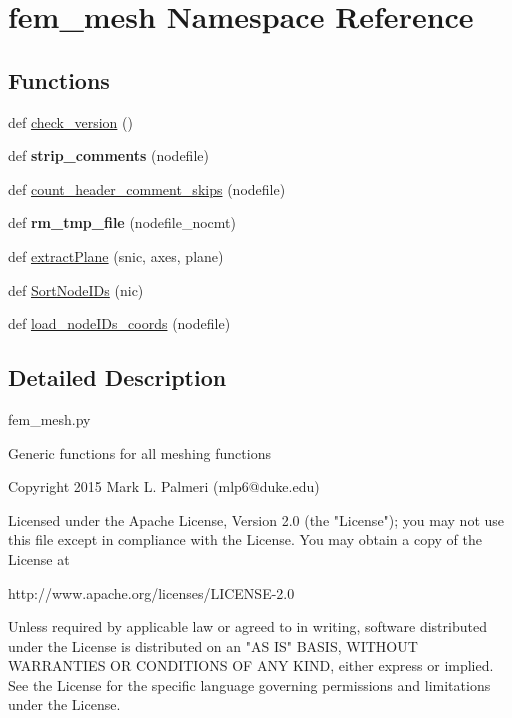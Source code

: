 \hypertarget{namespacefem__mesh}{}\section{fem\+\_\+mesh Namespace Reference}
\label{namespacefem__mesh}
\subsection*{Functions}
\begin{DoxyCompactItemize}
\item 
def \hyperlink{namespacefem__mesh_a54340024168d84ee90e2731de604b7c9}{check\+\_\+version} ()
\item 
\hypertarget{namespacefem__mesh_acb8e341fc4a11a41122239e92e80ef25}{}def {\bfseries strip\+\_\+comments} (nodefile)\label{namespacefem__mesh_acb8e341fc4a11a41122239e92e80ef25}

\item 
def \hyperlink{namespacefem__mesh_aecdc87300dbd7f57c9590be2eedfd4fd}{count\+\_\+header\+\_\+comment\+\_\+skips} (nodefile)
\item 
\hypertarget{namespacefem__mesh_a482eed29183411d7e6275f9936210eca}{}def {\bfseries rm\+\_\+tmp\+\_\+file} (nodefile\+\_\+nocmt)\label{namespacefem__mesh_a482eed29183411d7e6275f9936210eca}

\item 
def \hyperlink{namespacefem__mesh_a9426734369dcc9c64d9076c9e64eb761}{extract\+Plane} (snic, axes, plane)
\item 
def \hyperlink{namespacefem__mesh_a5c79e3243c130de5fe8c49b64ce408b1}{Sort\+Node\+I\+Ds} (nic)
\item 
def \hyperlink{namespacefem__mesh_ac22e65233eb8ce28d6b9d61969697859}{load\+\_\+node\+I\+Ds\+\_\+coords} (nodefile)
\end{DoxyCompactItemize}


\subsection{Detailed Description}
\begin{DoxyVerb}fem_mesh.py

Generic functions for all meshing functions

Copyright 2015 Mark L. Palmeri (mlp6@duke.edu)

Licensed under the Apache License, Version 2.0 (the "License");
you may not use this file except in compliance with the License.
You may obtain a copy of the License at

http://www.apache.org/licenses/LICENSE-2.0

Unless required by applicable law or agreed to in writing, software
distributed under the License is distributed on an "AS IS" BASIS,
WITHOUT WARRANTIES OR CONDITIONS OF ANY KIND, either express or implied.
See the License for the specific language governing permissions and
limitations under the License.
\end{DoxyVerb}
 


